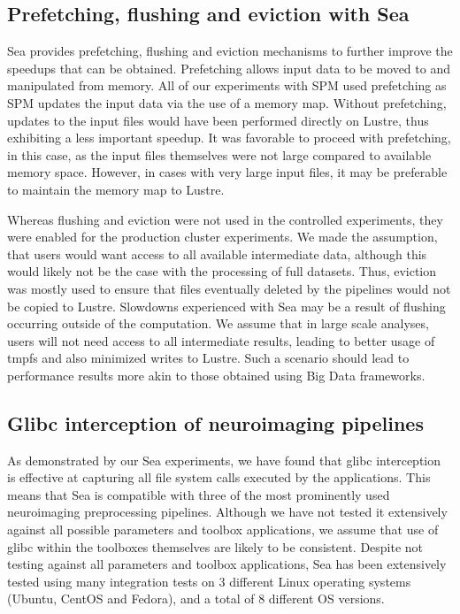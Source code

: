     \subsection{Prefetching, flushing and eviction with Sea}

    Sea provides prefetching, flushing and eviction mechanisms to further
    improve the speedups that can be obtained. Prefetching allows input data to
    be moved to and manipulated from memory. All of our experiments with SPM
    used prefetching as SPM updates the input data via the use of a memory map.
    Without prefetching, updates to the input files would have been performed
    directly on Lustre, thus exhibiting a less important speedup. It was
    favorable to proceed with prefetching, in this case, as the input files
    themselves were not large compared to available memory space. However, in
    cases with very large input files, it may be preferable to maintain the
    memory map to Lustre.

    Whereas flushing and eviction were not used in the controlled experiments,
    they were enabled for the production cluster experiments. We made the assumption, that
    users would want access to all available intermediate data, although this
    would likely not be the case with the processing of full datasets. Thus,
    eviction was mostly used to ensure that files eventually deleted by the
    pipelines would not be copied to Lustre. Slowdowns experienced with Sea may
    be a result of flushing occurring outside of the computation. We assume that
    in large scale analyses, users will not need access to all intermediate
    results, leading to better usage of tmpfs and also minimized writes to
    Lustre. Such a scenario should lead to performance results more akin to
    those obtained using Big Data frameworks.

    \subsection{Glibc interception of neuroimaging pipelines}
    
    As demonstrated by our Sea experiments, we have found that glibc interception
    is effective at capturing all file system calls executed by the
    applications. This means that Sea is compatible with three of the most
    prominently used neuroimaging preprocessing pipelines. Although we have not
    tested it extensively against all possible parameters and toolbox
    applications, we assume that use of glibc within the toolboxes themselves are
    likely to be consistent. Despite not testing against all parameters and
    toolbox applications, Sea has been extensively tested using many integration
    tests on 3 different Linux operating systems (Ubuntu, CentOS and Fedora),
    and a total of 8 different OS versions.

